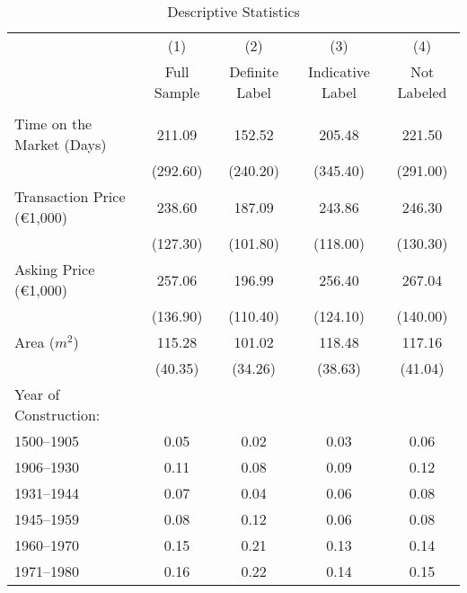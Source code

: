 \documentclass[12pt]{article}
\begin{document}
\newpage
\begin{table}[H]
\footnotesize
  \centering
  \caption{Descriptive Statistics}
      \begin{tabular}{lcccc}
\hline
                &\multicolumn{1}{c}{(1)}&\multicolumn{1}{c}{(2)}&\multicolumn{1}{c}{(3)}&\multicolumn{1}{c}{(4)}\\
& Full Sample                      & Definite Label & Indicative Label & Not Labeled \\
\hline

&&&&\\
Time on the Market (Days)                       & 211.09         & 152.52           & 205.48      & 221.50    \\
                                 & (292.60)       & (240.20)         & (345.40)    & (291.00)  \\
Transaction Price (\euro 1,000) & 238.60         & 187.09           & 243.86      & 246.30    \\
                                 & (127.30)       & (101.80)         & (118.00)    & (130.30)  \\
Asking Price (\euro  1,000)      & 257.06         & 196.99           & 256.40      & 267.04    \\
                                 & (136.90)       & (110.40)         & (124.10)    & (140.00)  \\
Area ($m^2$)                        & 115.28         & 101.02           & 118.48      & 117.16    \\
                                 & (40.35)        & (34.26)          & (38.63)     & (41.04)   \\
Year of Construction:            &                &                  &             &           \\
1500–1905                        & 0.05           & 0.02             & 0.03        & 0.06      \\
1906–1930                        & 0.11           & 0.08             & 0.09        & 0.12      \\
1931–1944                        & 0.07           & 0.04             & 0.06        & 0.08      \\
1945–1959                        & 0.08           & 0.12             & 0.06        & 0.08      \\
1960–1970                        & 0.15           & 0.21             & 0.13        & 0.14      \\
1971–1980                        & 0.16           & 0.22             & 0.14        & 0.15      \\

\end{tabular}
\end{table}
\end{document}

